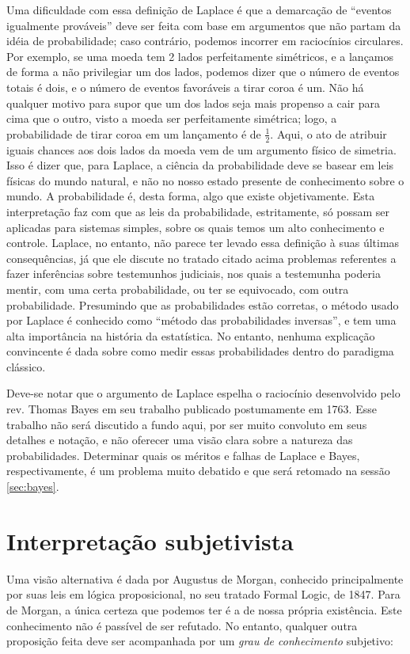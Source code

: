 Uma dificuldade com essa definição de Laplace é que a demarcação de ``eventos igualmente prováveis'' deve ser feita
com base em argumentos que não partam da idéia de probabilidade; caso contrário, podemos incorrer em raciocínios
circulares. Por exemplo, se uma moeda tem 2 lados perfeitamente simétricos, e a lançamos de forma a não privilegiar um dos lados,
podemos dizer que o número de eventos totais é dois, e o número de eventos favoráveis a tirar coroa é um. Não há qualquer motivo
para supor que um dos lados seja mais propenso a cair para cima que o outro, visto a moeda ser perfeitamente simétrica; logo,
a probabilidade de tirar coroa em um lançamento é de $\frac{1}{2}$. Aqui, o ato de atribuir iguais chances aos dois
lados da moeda vem de um argumento físico de simetria. Isso é dizer que, para Laplace,
a ciência da probabilidade deve se basear em leis físicas do mundo natural, e não no nosso estado presente de conhecimento 
sobre o mundo. A probabilidade é, desta forma, algo que existe objetivamente.
Esta interpretação faz com que as leis da probabilidade, estritamente, só possam ser aplicadas para 
sistemas simples, sobre os quais temos um alto conhecimento e controle. Laplace, no entanto, não parece ter levado essa 
definição à suas últimas consequências, já que ele discute no tratado citado acima problemas referentes a fazer inferências 
sobre testemunhos judiciais, nos 
quais a testemunha poderia mentir, com uma certa probabilidade, ou ter se equivocado, com outra probabilidade. 
Presumindo que as probabilidades estão corretas, o método usado por Laplace é conhecido como ``método das probabilidades
inversas'', e tem uma alta importância na história da estatística.  No entanto, 
nenhuma explicação convincente é dada sobre como medir essas probabilidades dentro do paradigma clássico.

Deve-se notar que o argumento de Laplace espelha o raciocínio desenvolvido pelo rev. Thomas Bayes em seu trabalho publicado
postumamente em 1763. Esse trabalho não será discutido a fundo aqui, por ser muito convoluto em seus detalhes e notação,
e não oferecer uma visão clara sobre a natureza das probabilidades.
Determinar quais os méritos e falhas de Laplace e Bayes, respectivamente, é um problema muito debatido e que será retomado na
sessão \ref{sec:bayes}.

\section{Interpretação subjetivista}
Uma visão alternativa é dada por Augustus de Morgan, conhecido principalmente por suas leis em lógica proposicional, 
no seu tratado Formal Logic, de 1847. Para de Morgan, a única certeza que podemos ter é a de nossa própria existência. 
Este conhecimento
não é passível de ser refutado. No entanto, qualquer outra proposição feita deve ser acompanhada por 
um {\em grau de conhecimento} subjetivo:

